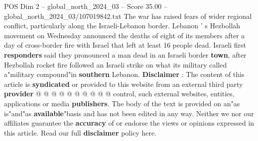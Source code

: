 \begin{textsample}{POS Dim 2 – global\_north\_2024\_03 – Score 35.00 – global\_north\_2024\_03/107019842.txt}
The war has raised fears of wider regional conflict, particularly along the Israeli-Lebanon border.
Lebanon ' s Hezbollah movement on Wednesday announced the deaths of eight of its members after a day of cross-border fire with Israel that left at least 16 people dead.
Israeli first \textbf{responders} said they pronounced a man dead in an Israeli border \textbf{town}, after Hezbollah rocket fire followed an Israeli strike on what its military called a"military compound"in \textbf{southern} Lebanon. \textbf{Disclaimer} : The content of this article is \textbf{syndicated} or provided to this website from an external third party \textbf{provider} @ @ @ @ @ @ @ @ @ @ control, such external websites, entities, applications or media \textbf{publishers}.
The body of the text is provided on an"as is"and"as \textbf{available}"basis and has not been edited in any way.
Neither we nor our affiliates guarantee the \textbf{accuracy} of or endorse the views or opinions expressed in this article.
Read our full \textbf{disclaimer} policy here.

\end{textsample}
